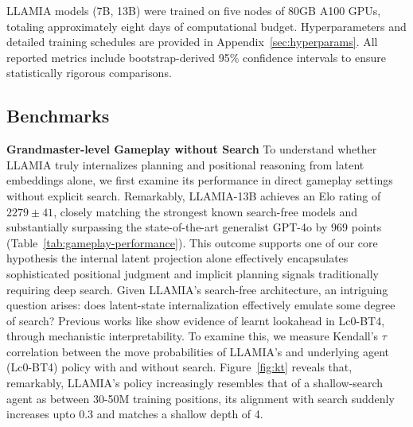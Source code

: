 \documentclass{article}
\theoremstyle{plain}
\theoremstyle{definition}
\theoremstyle{remark}
\begin{document}
LLAMIA models (7B, 13B) were trained on five nodes of 80GB A100 GPUs, totaling approximately eight days of computational budget. Hyperparameters and detailed training schedules are provided in Appendix~\ref{sec:hyperparams}. All reported metrics include bootstrap-derived 95\% confidence intervals to ensure statistically rigorous comparisons.

\subsection{Benchmarks}
\textbf{Grandmaster-level Gameplay without Search}
\label{sec:grandmaster_no_search} To understand whether LLAMIA truly internalizes planning and positional reasoning from latent embeddings alone, we first examine its performance in direct gameplay settings without explicit search. Remarkably, LLAMIA-13B achieves an Elo rating of $2279\pm41$, closely matching the strongest known search-free models and substantially surpassing the state-of-the-art generalist GPT-4o by 969 points (Table~\ref{tab:gameplay-performance}). This outcome supports one of our core hypothesis the internal latent projection alone effectively encapsulates sophisticated positional judgment and implicit planning signals traditionally requiring deep search. Given LLAMIA’s search-free architecture, an intriguing question arises: does latent-state internalization effectively emulate some degree of search? Previous works like \cite{jenner2024evidence} show evidence of learnt lookahead in Lc0-BT4, through mechanistic interpretability. To examine this, we measure Kendall’s $\tau$ correlation between the move probabilities of LLAMIA’s and underlying agent (Lc0-BT4) policy with and without search. Figure~\ref{fig:kt} reveals that, remarkably, LLAMIA’s policy increasingly resembles that of a shallow-search agent as between 30-50M training positions, its alignment with search suddenly increases upto 0.3 and matches a shallow depth of 4.
\end{document}
